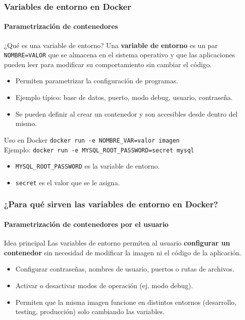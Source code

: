 
\begin{frame}
    \frametitle{Variables de entorno en Docker}
    \framesubtitle{Parametrización de contenedores}

    \begin{block}{¿Qué es una variable de entorno?}
        Una \textbf{variable de entorno} es un par \texttt{NOMBRE=VALOR} 
        que se almacena en el sistema operativo y que las aplicaciones 
        pueden leer para modificar su comportamiento sin cambiar el código.
    \end{block}

    \begin{itemize}
        \item Permiten parametrizar la configuración de programas.
        \item Ejemplo típico: base de datos, puerto, modo debug, usuario, contraseña.
        \item Se pueden definir al crear un contenedor y son accesibles desde dentro del mismo.
    \end{itemize}

    \pause
    \begin{block}{Uso en Docker}
        \texttt{docker run -e NOMBRE\_VAR=valor imagen} \\
        Ejemplo: \texttt{docker run -e MYSQL\_ROOT\_PASSWORD=secret mysql}
        
        \begin{itemize}
            \item \texttt{MYSQL\_ROOT\_PASSWORD} es la variable de entorno.
            \item \texttt{secret} es el valor que se le asigna.
        \end{itemize}
    \end{block}
\end{frame}


\begin{frame}
    \frametitle{¿Para qué sirven las variables de entorno en Docker?}
    \framesubtitle{Parametrización de contenedores por el usuario}

    \begin{block}{Idea principal}
        Las variables de entorno permiten al usuario \textbf{configurar un contenedor} 
        sin necesidad de modificar la imagen ni el código de la aplicación.
    \end{block}

    \begin{itemize}
        \item Configurar contraseñas, nombres de usuario, puertos o rutas de archivos.
        \item Activar o desactivar modos de operación (ej. modo debug).
        \item Permiten que la misma imagen funcione en distintos entornos 
              (desarrollo, testing, producción) solo cambiando las variables.
    \end{itemize}
\end{frame}

